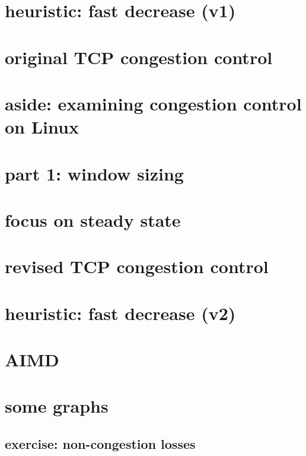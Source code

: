\section{heuristic: fast decrease (v1)}


\section{original TCP congestion control}


\section{aside: examining congestion control on Linux}


\section{part 1: window sizing}

\section{focus on steady state}


\section{revised TCP congestion control}



\section{heuristic: fast decrease (v2)}


\section{AIMD}



\section{some graphs}



\subsection{exercise: non-congestion losses} %





